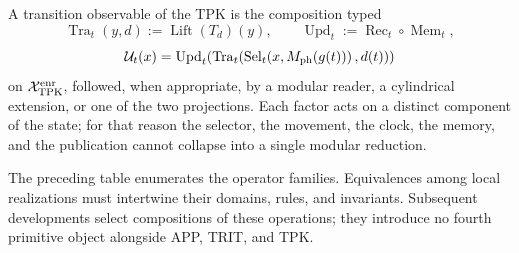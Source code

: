 \begin{theorem}
\label{thm:composicion-dinamica-tpk-rev11}
A transition observable of the TPK is the composition typed
\[
 \operatorname{Tra}_t(y,d):=\operatorname{Lift}(T_d)(y),
 \qquad
 \operatorname{Upd}_t:=\operatorname{Rec}_t\circ\operatorname{Mem}_t,
\]
\[
 \mathcal U_t(x)
 =\operatorname{Upd}_t\!\left(
  \operatorname{Tra}_t\!\left(
   \operatorname{Sel}_t\!\left(x,M_{\rm ph}(g(t))\right),d(t)
  \right)\right)
\]
on \(\mathcal X_{\rm TPK}^{\rm enr}\), followed, when appropriate, by
a modular reader, a cylindrical extension, or one of the two projections.
Each factor acts on a distinct component of the state; for that reason the
selector, the movement, the clock, the memory, and the publication cannot
collapse into a single modular reduction.
\end{theorem}

The preceding table enumerates the operator families. Equivalences among
local realizations must intertwine their domains, rules, and invariants.
Subsequent developments select compositions of these operations;
they introduce no fourth primitive object alongside APP, TRIT, and TPK.
